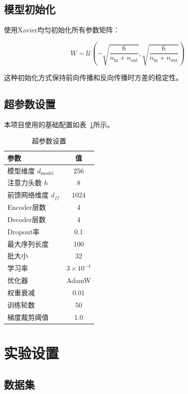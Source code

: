 \documentclass[UTF8,12pt,a4paper]{ctexart}
\begin{document}
\subsection{模型初始化}

使用Xavier均匀初始化所有参数矩阵：

\begin{equation}
W \sim \mathcal{U}\left(-\sqrt{\frac{6}{n_{\text{in}} + n_{\text{out}}}}, \sqrt{\frac{6}{n_{\text{in}} + n_{\text{out}}}}\right)
\end{equation}

这种初始化方式保持前向传播和反向传播时方差的稳定性。

\subsection{超参数设置}

本项目使用的基础配置如表~\ref{tab:hyperparams}所示。

\begin{table}[H]
\centering
\caption{超参数设置}
\label{tab:hyperparams}
\begin{tabular}{lc}
\toprule
\textbf{参数} & \textbf{值} \\
\midrule
模型维度 $d_{\text{model}}$ & 256 \\
注意力头数 $h$ & 8 \\
前馈网络维度 $d_{ff}$ & 1024 \\
Encoder层数 & 4 \\
Decoder层数 & 4 \\
Dropout率 & 0.1 \\
最大序列长度 & 100 \\
\midrule
批大小 & 32 \\
学习率 & $3 \times 10^{-4}$ \\
优化器 & AdamW \\
权重衰减 & 0.01 \\
训练轮数 & 50 \\
梯度裁剪阈值 & 1.0 \\
\bottomrule
\end{tabular}
\end{table}

\section{实验设置}

\subsection{数据集}
\end{document}
